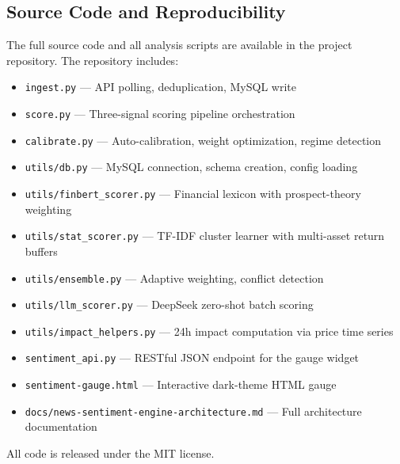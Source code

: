 \subsection{Source Code and Reproducibility}

The full source code and all analysis scripts are available in the project repository. The repository includes:

\begin{itemize}
    \item \texttt{ingest.py} --- API polling, deduplication, MySQL write
    \item \texttt{score.py} --- Three-signal scoring pipeline orchestration
    \item \texttt{calibrate.py} --- Auto-calibration, weight optimization, regime detection
    \item \texttt{utils/db.py} --- MySQL connection, schema creation, config loading
    \item \texttt{utils/finbert\_scorer.py} --- Financial lexicon with prospect-theory weighting
    \item \texttt{utils/stat\_scorer.py} --- TF-IDF cluster learner with multi-asset return buffers
    \item \texttt{utils/ensemble.py} --- Adaptive weighting, conflict detection
    \item \texttt{utils/llm\_scorer.py} --- DeepSeek zero-shot batch scoring
    \item \texttt{utils/impact\_helpers.py} --- 24h impact computation via price time series
    \item \texttt{sentiment\_api.py} --- RESTful JSON endpoint for the gauge widget
    \item \texttt{sentiment-gauge.html} --- Interactive dark-theme HTML gauge
    \item \texttt{docs/news-sentiment-engine-architecture.md} --- Full architecture documentation
\end{itemize}

All code is released under the MIT license.
